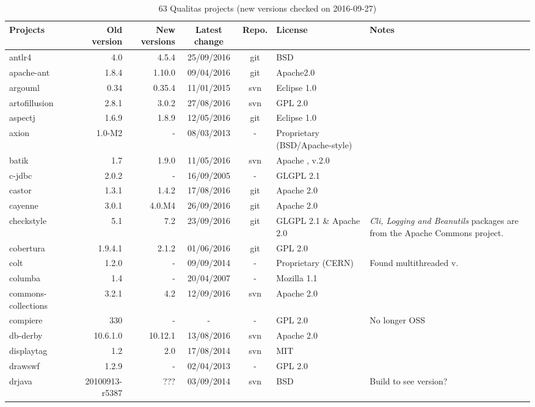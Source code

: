 \documentclass{sig-alternate-05-2015}
\begin{document}
\begin{table}
	\centering
	\caption{63 Qualitas projects (new versions checked on 2016-09-27)}
	\label{t:new_and_old}
	\small
		\begin{tabular}{l|r|r|c|c|p{3cm}|p{3cm}}
			\hline 
			Projects & Old version & New versions & Latest change & Repo. & License & Notes \\
			\hline
			antlr4 & 4.0 & 4.5.4 & 25/09/2016 & git & BSD \\
			apache-ant & 1.8.4 & 1.10.0 & 09/04/2016 & git & Apache2.0 \\
			argouml & 0.34 & 0.35.4 & 11/01/2015 	& svn & Eclipse  1.0 \\
			artofillusion & 2.8.1 & 3.0.2 & 27/08/2016 & svn & GPL 2.0 \\
			aspectj & 1.6.9 & 1.8.9 & 12/05/2016 & git & Eclipse   1.0 \\
			axion & 1.0-M2 & - & 08/03/2013 & - & Proprietary (BSD/Apache-style) \\
			batik & 1.7 & 1.9.0 & 11/05/2016 & svn & Apache , v.2.0 \\
			c-jdbc & 2.0.2 & - & 16/09/2005 & - & GLGPL 2.1 \\
			castor & 1.3.1 & 1.4.2 & 17/08/2016 & git & Apache 2.0 \\
			cayenne & 3.0.1 & 4.0.M4 &  26/09/2016 & git & Apache 2.0 \\
			checkstyle & 5.1 & 7.2  & 23/09/2016 & git & GLGPL 2.1 \& Apache 2.0 & \textit{Cli, Logging and Beanutils} packages are from the Apache Commons project. \\
			cobertura & 1.9.4.1 & 2.1.2 & 01/06/2016 & git & GPL 2.0  \\
			colt & 1.2.0 & - & 09/09/2014 & - & Proprietary (CERN) & Found multithreaded v. \\
			columba & 1.4 & - & 20/04/2007 & - & Mozilla   1.1  \\
			commons-collections & 3.2.1 & 4.2 & 12/09/2016 & svn & Apache 2.0 \\
			compiere & 330 & - & - & - & GPL 2.0 & No longer OSS \\
			db-derby & 10.6.1.0 & 10.12.1 & 13/08/2016 & svn & Apache 2.0 \\
			displaytag & 1.2 & 2.0 & 17/08/2014 & svn & MIT  \\
			drawswf & 1.2.9 & - & 02/04/2013 & - & GPL 2.0 \\
			drjava & 20100913-r5387 & ??? & 03/09/2014 & svn & BSD  & Build to see version? \\

\end{tabular}
\end{table}
\end{document}
